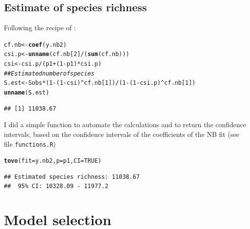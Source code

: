 \documentclass[12pt, A4]{article}\usepackage[]{graphicx}\usepackage[]{color}
\makeatletter
\newcommand{\hlnum}[1]{\textcolor[rgb]{0.686,0.059,0.569}{#1}}%
\newcommand{\hlcom}[1]{\textcolor[rgb]{0.678,0.584,0.686}{\textit{#1}}}%
\newcommand{\hlopt}[1]{\textcolor[rgb]{0,0,0}{#1}}%
\newcommand{\hlstd}[1]{\textcolor[rgb]{0.345,0.345,0.345}{#1}}%
\newcommand{\hlkwb}[1]{\textcolor[rgb]{0.69,0.353,0.396}{#1}}%
\newcommand{\hlkwc}[1]{\textcolor[rgb]{0.333,0.667,0.333}{#1}}%
\newcommand{\hlkwd}[1]{\textcolor[rgb]{0.737,0.353,0.396}{\textbf{#1}}}%
\newenvironment{kframe}{%
 \def\at@end@of@kframe{}%
 \ifinner\ifhmode%
  \def\at@end@of@kframe{\end{minipage}}%
  \begin{minipage}{\columnwidth}%
 \fi\fi%
 \def\FrameCommand##1{\hskip\@totalleftmargin \hskip-\fboxsep
 \colorbox{shadecolor}{##1}\hskip-\fboxsep
     \hskip-\linewidth \hskip-\@totalleftmargin \hskip\columnwidth}%
 \MakeFramed {\advance\hsize-\width
   \@totalleftmargin\z@ \linewidth\hsize
   \@setminipage}}%
 {\par\unskip\endMakeFramed%
 \at@end@of@kframe}
\newenvironment{knitrout}{}{} %
\newcommand{\code}[1]{\texttt{#1}}
\makeatother
\begin{document}
\subsection*{Estimate of  species richness}

Following the recipe of \citet{tovo2017}:

 
\begin{knitrout}
\color{fgcolor}\begin{kframe}
\begin{alltt}
\hlstd{cf.nb} \hlkwb{<-} \hlkwd{coef}\hlstd{(y.nb2)}
\hlstd{csi.p} \hlkwb{<-} \hlkwd{unname}\hlstd{(cf.nb[}\hlnum{2}\hlstd{]}\hlopt{/}\hlstd{(}\hlkwd{sum}\hlstd{(cf.nb)))}
\hlstd{csi} \hlkwb{<-} \hlstd{csi.p}\hlopt{/}\hlstd{(p1}\hlopt{+}\hlstd{(}\hlnum{1}\hlopt{-}\hlstd{p1)}\hlopt{*}\hlstd{csi.p)}
\hlcom{## Estimated number of species }
\hlstd{S.est} \hlkwb{<-} \hlstd{Sobs}\hlopt{*}\hlstd{(}\hlnum{1}\hlopt{-}\hlstd{(}\hlnum{1}\hlopt{-}\hlstd{csi)}\hlopt{^}\hlstd{cf.nb[}\hlnum{1}\hlstd{])} \hlopt{/} \hlstd{(}\hlnum{1}\hlopt{-}\hlstd{(}\hlnum{1}\hlopt{-}\hlstd{csi.p)}\hlopt{^}\hlstd{cf.nb[}\hlnum{1}\hlstd{])}
\hlkwd{unname}\hlstd{(S.est)}
\end{alltt}
\begin{verbatim}
## [1] 11038.67
\end{verbatim}
\end{kframe}
\end{knitrout}

I did a simple function to automate the calculations and to return
the confidence intervals, based on the confidence intervals of the 
coefficients of the NB fit (see file \code{functions.R})

 
\begin{knitrout}
\color{fgcolor}\begin{kframe}
\begin{alltt}
\hlkwd{tovo}\hlstd{(}\hlkwc{fit} \hlstd{= y.nb2,} \hlkwc{p} \hlstd{= p1,} \hlkwc{CI}\hlstd{=}\hlnum{TRUE}\hlstd{)}
\end{alltt}
\begin{verbatim}
## Estimated species richness: 11038.67 
##  95% CI: 10328.09 - 11977.2
\end{verbatim}
\end{kframe}
\end{knitrout}


\section*{Model selection}
\end{document}
